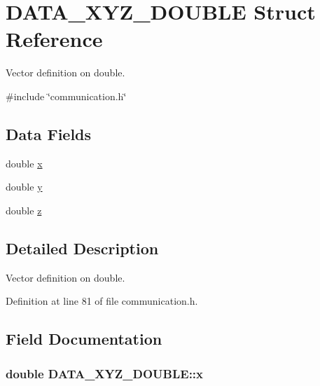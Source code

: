 \hypertarget{structDATA__XYZ__DOUBLE}{\section{D\-A\-T\-A\-\_\-\-X\-Y\-Z\-\_\-\-D\-O\-U\-B\-L\-E Struct Reference}
\label{structDATA__XYZ__DOUBLE}
}


Vector definition on double.  




{\ttfamily \#include \char`\"{}communication.\-h\char`\"{}}

\subsection*{Data Fields}
\begin{DoxyCompactItemize}
\item 
double \hyperlink{structDATA__XYZ__DOUBLE_a22868cc99a423900e7b82d015a5eb91f}{x}
\item 
double \hyperlink{structDATA__XYZ__DOUBLE_a198a27b5df3b5b0bf461b0e481e22a82}{y}
\item 
double \hyperlink{structDATA__XYZ__DOUBLE_a9556e8868c223ff3e28756ea18a284c0}{z}
\end{DoxyCompactItemize}


\subsection{Detailed Description}
Vector definition on double. 

Definition at line 81 of file communication.\-h.



\subsection{Field Documentation}
\hypertarget{structDATA__XYZ__DOUBLE_a22868cc99a423900e7b82d015a5eb91f}{
\subsubsection[{x}]{\setlength{\rightskip}{0pt plus 5cm}double D\-A\-T\-A\-\_\-\-X\-Y\-Z\-\_\-\-D\-O\-U\-B\-L\-E\-::x}}\label{structDATA__XYZ__DOUBLE_a22868cc99a423900e7b82d015a5eb91f}


